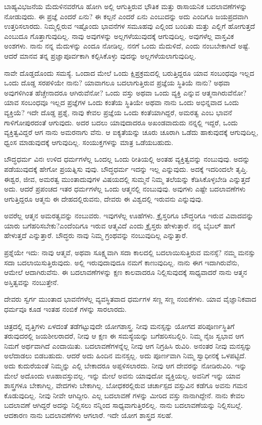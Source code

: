 ಬಾಹ್ಯವಿಭಜನೆಯ ಮೆದುಳಿನವರೆಗೂ ಹೋಗಿ ಅಲ್ಲಿ ಆಗುತ್ತಿರುವ ಭೌತಿಕ ಮತ್ತು ರಾಸಾಯನಿಕ ಬದಲಾವಣೆಗಳನ್ನು ನೋಡುವುದು. ಈ ಪ್ರಜ್ಞೆ ಎಂದರೆ ಏನು? ಈ ಕಲ್ಪನೆ ಎಂದರೆ ಏನು ಎಂಬುದನ್ನು ಅದು ಎಂದಿಗೂ ಜಯಪ್ರದವಾಗಿ ಉತ್ತರಿಸಲಾರದು. ನಿಮ್ಮಲ್ಲಿರುವ ಇಷ್ಟೊಂದು ಭಾವನೆಗಳ ಸಮೂಹವು ಎಲ್ಲಿಂದ ಬಂದಿತು ಮತ್ತು ಎಲ್ಲಿಗೆ ಹೋಗುತ್ತದೆ ಎಂಬುದೂ ಗೊತ್ತಾಗುವುದಿಲ್ಲ. ನಾವು ಅವುಗಳನ್ನು ಅಲ್ಲಗಳೆಯುವುದಕ್ಕೆ ಆಗುವುದಿಲ್ಲ. ಅವುಗಳೆಲ್ಲ ವಾಸ್ತವಿಕ ಅಂಶಗಳು. ನಾನು ನನ್ನ ಮೆದುಳನ್ನು ಎಂದೂ ನೋಡಿಲ್ಲ. ನನಗೆ ಒಂದು ಮೆದುಳಿದೆ, ಎಂದು ನಂಬಬೇಕಾಗಿದೆ ಅಷ್ಟೆ. ಆದರೆ ಮಾನವ ತನ್ನ ಪ್ರಜ್ಞಾಪೂರ್ವಕಾಗಿ ಕಲ್ಪಿಸಿಕೊಳ್ಳು ವುದನ್ನು ಅಲ್ಲಗಳೆಯಲಾಗುವುದಿಲ್ಲ.

ನಾವೇ ದೊಡ್ಡದೊಂದು ಸಮಸ್ಯೆ. ಒಂದಾದ ಮೇಲೆ ಒಂದು ಕ್ಷಿಪ್ರಕ್ರಮದಲ್ಲಿ ಬರುತ್ತಿದ್ದರೂ ಯಾವ ಸಂಬಂಧವೂ ಇಲ್ಲದ ಒಂದು ದೊಡ್ಡ ಸರಪಳಿಯೇ ನಾನು? ಯಾವಾಗಲೂ ಬದಲಾಗುತ್ತಿರುವ ಪ್ರಜ್ಞೆಯ ಸ್ಥಿತಿಯೆ ನಾನು? ಅಥವಾ ಅವುಗಳಿಗಿಂತ ಹೆಚ್ಚೇನಾದರೂ ಆಗಿರುವೆನೋ? ಒಂದು ವಸ್ತು ಅಥವಾ ಒಂದು ವ್ಯಕ್ತಿ ಎನ್ನುವ ಆತ್ಮನಾಗಿರುವೆನೋ? ಯಾವ ಸಂಬಂಧವೂ ಇಲ್ಲದ ಪ್ರಜ್ಞೆಗಳ ಒಂದು ಕಂತೆಯ ಸ್ಥಿತಿಯೇ ಅಥವಾ ನಾನು ಒಂದು ಅಭಿನ್ನವಾದ ಒಂದು ವ್ಯಕ್ತಿಯೆ? ಇದೇ ದೊಡ್ಡ ಪ್ರಶ್ನೆ, ನಾವು ಕೇವಲ ಪ್ರಜ್ಞೆಯ ಒಂದು ಕಂತೆಯಾಗಿದ್ದರೆ, ಅಮರತ್ವ ಎಂಬ ಭಾವನೆ ಗಾಳಿಗೋಪುರದಂತೆ ಆಗುವುದು. ಅದರ ಬದಲು ಯಾವುದಾದರೂ ಅಖಂಡವಾದುದು ನನ್ನಲ್ಲಿ ಇದ್ದರೆ, ಒಂದು ವ್ಯಕ್ತಿತ್ವವಿದ್ದರೆ ಆಗ ನಾನು ಅಮರನಾಗು ವೆನು. ಆ ಐಕ್ಯತೆಯನ್ನು ಚೂರು ಚೂರಾಗಿ ಒಡೆದು ಹಾಕುವುದಕ್ಕೆ ಆಗುವುದಿಲ್ಲ, ಧ್ವಂಸ ಮಾಡುವುದಕ್ಕೆ ಆಗುವುದಿಲ್ಲ. ಸಂಯುಕ್ತಗಳನ್ನು ಮಾತ್ರ ಒಡೆಯಬಹುದು.

ಬೌದ್ಧಧರ್ಮ ವಿನಃ ಉಳಿದ ಧರ್ಮಗಳೆಲ್ಲ ಒಂದಲ್ಲ ಒಂದು ರೀತಿಯಲ್ಲಿ ಅಂತಹ ವ್ಯಕ್ತಿತ್ವವನ್ನು ನಂಬುವುವು. ಅದನ್ನು ಪಡೆಯುವುದಕ್ಕೆ ಹೇಗೋ ಪ್ರಯತ್ನಿಸು ವುವು. ಬೌದ್ಧಧರ್ಮ ಇದನ್ನು ಇಲ್ಲ ಎನ್ನುವುದು. ಅದಕ್ಕೆ ಇದರಿಂದಲೇ ತೃಪ್ತಿ. ಈಶ್ವರ, ಜೀವ, ಅಮರತ್ವ ಮುಂತಾದುವುಗಳ ವಿಷಯದಲ್ಲಿ ಸುಮ್ಮನೆ ನಿಮ್ಮ ತಲೆಯನ್ನು ಕೆಡಿಸಿಕೊಳ್ಳಬೇಡಿ ಎನ್ನುತ್ತದೆ ಅದು. ಆದರೆ ಪ್ರಪಂಚದ ಇತರ ಧರ್ಮಗಳೆಲ್ಲ ಒಂದು ಆತ್ಮನಲ್ಲಿ ನಂಬುವುವು. ಅವುಗಳು ಎಷ್ಟೇ ಬದಲಾವಣೆಗಳು ಆಗುತ್ತಿದ್ದರೂ ಆತ್ಮನು ಈ ದೇಹದಲ್ಲಿರುವನು, ದೇವರು ಈ ವಿಶ್ವದಲ್ಲಿ ಇರುವನು ಎನ್ನುವುವು.

ಅವರೆಲ್ಲ ಆತ್ಮನ ಅಮರತ್ವವನ್ನು ನಂಬುವರು. ಇವುಗಳೆಲ್ಲ ಊಹೆಗಳು. ಕ್ರೈಸ್ತರಿಗೂ ಬೌದ್ಧರಿಗೂ ಇರುವ ವಿವಾದವನ್ನು ಯಾರು ಬಗೆಹರಿಸಬೇಕು?ಎಂದೆಂದಿಗೂ ಇರುವ ಆತ್ಮವಿದೆ ಎಂದು ಕ್ರೈಸ್ತರು ಹೇಳುತ್ತಾರೆ. ನನ್ನ ಬೈಬಲ್​ ಹಾಗೆ ಹೇಳುತ್ತದೆ ಎನ್ನುತ್ತಾರೆ. ಬೌದ್ಧರು ನಾವು ನಿಮ್ಮ ಗ್ರಂಥವನ್ನು ನಂಬುವುದಿಲ್ಲ ಎನ್ನುತ್ತಾರೆ.

ಪ್ರಶ್ನೆಯೇ ಇದು: ನಾವು ಆತ್ಮವೆ, ಅಥವಾ ಸೂಕ್ಷ್ಮವಾಗಿ ಸದಾ ಕಾಲದಲ್ಲಿ ಬದಲಾಯಿಸುತ್ತಿರುವ ಮನಸ್ಸೆ? ನಮ್ಮ ಮನಸ್ಸು ಸದಾ ಬದಲಾಯಿಸುತ್ತಿರುವುದು. ಅಲ್ಲಿ ಇರುವುದಾವುದೂ ನಮಗೆ ಕಾಣುವುದಿಲ್ಲ. ನಾನು ಈಗ ಇದಾಗಿರುವೆನು, ಆಮೇಲೆ ಆದಾಗಿರುವೆನು. ಈ ಬದಲಾವಣೆಗಳನ್ನು ಕ್ಷಣ ಕಾಲವಾದರೂ ನಿಲ್ಲಿಸುವುದಕ್ಕೆ ಸಾಧ್ಯವಾದರೆ ನಾನು ಆತ್ಮನ ಅಸ್ತಿತ್ವವನ್ನು ನಂಬುತ್ತೇನೆ.

ದೇವರು ಸ್ವರ್ಗ ಮುಂತಾದ ಭಾವನೆಗಳೆಲ್ಲ ವ್ಯವಸ್ಥಿತವಾದ ಧರ್ಮಗಳ ಸಣ್ಣ ಸಣ್ಣ ನಂಬಿಕೆಗಳು. ಯಾವ ವೈಜ್ಞಾನಿಕವಾದ ಧರ್ಮವೂ ಕೂಡ ಇಂತಹ ನಂಬಿಕೆ ಗಳನ್ನು ಸಾರಲಾರದು.

ಚಿತ್ರದಲ್ಲಿ ವೃತ್ತಿಗಳು ಏಳದಂತೆ ತಡೆಗಟ್ಟುವುದೇ ಯೋಗಶಾಸ್ತ್ರ. ನೀವು ಮನಸ್ಸನ್ನು ಯೋಗದ ಪರಿಪೂರ್ಣಸ್ಥಿತಿಗೆ ತರುವುದರಲ್ಲಿ ಜಯಶೀಲರಾದರೆ, ನೀವು ಆ ಕ್ಷಣ ಈ ಸಮಸ್ಯೆಯನ್ನು ಬಗೆಹರಿಸಬಲ್ಲಿರಿ. ನಿಮ್ಮ ನೈಜ ಸ್ವಭಾವ ಆಗ ನಿಮಗೆ ಅರ್ಥವಾಗಿದೆ ಎಂದಾಯಿತು. ಬದಲಾವಣೆಗಳನ್ನೆಲ್ಲ ನೀವು ಆಗ ನಿಗ್ರಹಿಸಿ ರುವಿರಿ. ಅನಂತರ ನೀವು ಮನಸ್ಸನ್ನು ಅಲೆದಾಡಲು ಬಿಡಬಹುದು. ಆದರೆ ಅದು ಹಿಂದಿನ ಮನಸ್ಸಲ್ಲ. ಅದು ಪೂರ್ಣವಾಗಿ ನಿಮ್ಮ ಸ್ವಾಧೀನಕ್ಕೆ ಒಳಪಟ್ಟಿದೆ. ಅದು ಕುದುರೆಯಂತೆ ನಿಮ್ಮನ್ನು ಎಲ್ಲಿ ಬೇಕಾದರೂ ಅಪ್ಪಳಿಸಲಾರದು. ನೀವು ಆಗ ದೇವರನ್ನು ನೋಡಿರುವಿರಿ. ಇನ್ನು ಮೇಲೆ ಅದೊಂದು ಊಹಾವಸ್ತುವಲ್ಲ. ಇನ್ನು ಮೇಲೆ ಅವನು ಯಾವುದೋ ವ್ಯಕ್ತಿಯಲ್ಲ. ಅವನಿಗೆ ಇನ್ನು ಯಾವ ಶಾಸ್ತ್ರಗಳೂ ಬೇಕಾಗಿಲ್ಲ, ವೇದಗಳು ಬೇಕಾಗಿಲ್ಲ. ಬೋಧಕರಲ್ಲಿರುವ ಚರ್ಚಾಸ್ಪದ ವಸ್ತುವಿನ ಕಡೆಗೂ ಅವನು ಗಮನ ಕೊಡುವುದಿಲ್ಲ. ನೀವು ನೀವೇ ಆಗಿದ್ದೀರಿ. ಎಲ್ಲ ಬದಲಾವಣೆ ಗಳನ್ನು ಮೀರಿದ ವಸ್ತು ನಾನಾಗಿದ್ದೇನೆ. ನಾನು ಕೇವಲ ಬದಲಾವಣೆ ಆಗಿದ್ದರೆ ಅದನ್ನು ನಿಲ್ಲಿಸಲು ನನ್ನಿಂದ ಸಾಧ್ಯವಾಗುತ್ತಿರಲಿಲ್ಲ. ನಾನು ಬದಲಾವಣೆಯನ್ನು ನಿಲ್ಲಿಸಬಲ್ಲೆ. ಆದಕಾರಣ ನಾನು ಬದಲಾವಣೆಗಳು ಆಗಲಾರೆ. ಇದೇ ಯೋಗ ಶಾಸ್ತ್ರದ ಸಲಹೆ.

